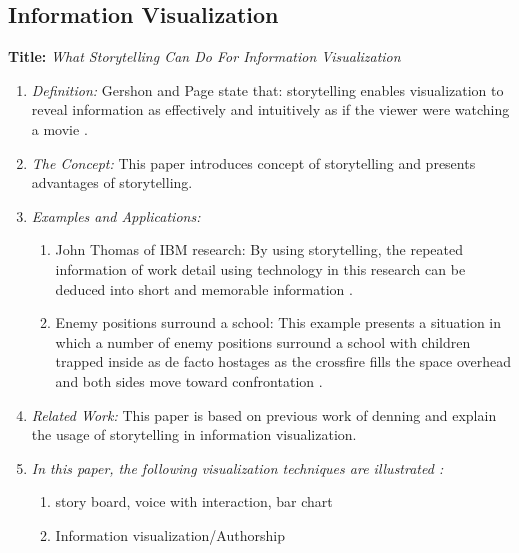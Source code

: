 \documentclass{egpubl}
\begin{document}
\subsection{Information Visualization}
\textbf{Title:} \textit{What Storytelling Can Do For Information Visualization}
\begin{enumerate}
\item \textit{Definition:} Gershon and Page state that: storytelling enables visualization to reveal information as effectively and intuitively as if the viewer were watching a movie \cite{Gershon2}. 
\item \textit{The Concept:} This paper introduces concept of storytelling and presents advantages of storytelling.
\item  \textit{Examples and Applications:} 
\begin{enumerate}
\item John Thomas of IBM research: By using storytelling, the repeated information of work detail using technology in this research can be deduced into short and memorable information \cite{Thomas}.
\item Enemy positions surround a school: This example presents a situation in which a number of enemy positions surround a school with children trapped inside as de facto hostages as the crossfire fills the space overhead and both sides move toward confrontation \cite{denning}.
\end{enumerate}
\item \textit{Related Work:} This paper is based on previous work of denning \cite{denning} and explain the usage of storytelling in information visualization.
\item \textit{In this paper, the following visualization techniques are illustrated :} 
\begin{enumerate}
\item story board, voice with interaction, bar chart
\item Information visualization/Authorship
\end{enumerate}
\end{enumerate}
\end{document}
